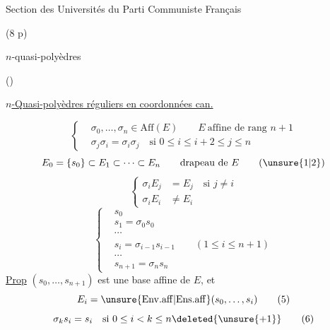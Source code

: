 \begin{flushright}
Section des Universités du Parti Communiste Français
\end{flushright}

(8 p)

\begin{flushright}
$n$-quasi-polyèdres

()
\end{flushright}

\uline{$n$-Quasi-polyèdres réguliers en coordonnées can.}

\[
\left\{\begin{aligned}
&\sigma_0,\ldots,\sigma_n\in\mathrm{Aff}(E)\qquad E\ \text{affine de rang }n+1\\
&\sigma_j\sigma_i=\sigma_i\sigma_j\quad\text{si }0\leq i\leq i+2\leq j\leq n
\end{aligned}\right.\tag*{(1)}
\]
\[
E_0=\{s_0\}\subset E_1\subset\cdots\subset E_n\qquad\text{drapeau de }E\tag*{(\unsure{1|2})}
\]
\[
\left\{\begin{aligned}
\sigma_iE_j&=E_j\quad\text{si }j\ne i\\
\sigma_iE_i&\ne E_i
\end{aligned}\right.\tag*{(3)}
\]
\[
\left\{\begin{aligned}
&s_0\\
&s_1=\sigma_0s_0\\
&\cdots\\
&s_i=\sigma_{i-1}s_{i-1}\qquad(1\leq i\leq n+1)\\
&\cdots\\
&s_{n+1}=\sigma_ns_n
\end{aligned}\right.\tag*{(4)}
\]
\uline{Prop} $(s_0,\ldots,s_{n+1})$ est une base affine de $E$, et
\[
E_i=\unsure{\mathrm{Env.aff}|\mathrm{Ens.aff}}(s_0,\ldots,s_i)\tag*{(5)}
\]
\[
\sigma_ks_i=s_i\quad\text{si }0\leq i<k\leq n\deleted{\unsure{+1}}\tag*{(6)}
\]

